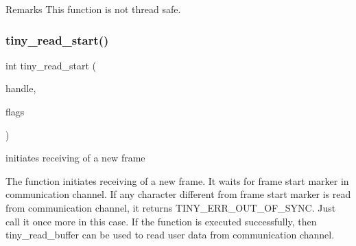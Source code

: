 \begin{DoxyRemark}{Remarks}
This function is not thread safe. 
\end{DoxyRemark}
\mbox{\label{group__ADVANCED__API_ga2f0547115de5b96a828d79f5491d22fa}} 
\subsubsection{\texorpdfstring{tiny\+\_\+read\+\_\+start()}{tiny\_read\_start()}}
{\footnotesize\ttfamily int tiny\+\_\+read\+\_\+start (\begin{DoxyParamCaption}\item[{\hyperlink{structSTinyData}{S\+Tiny\+Data} $\ast$}]{handle,  }\item[{uint8\+\_\+t}]{flags }\end{DoxyParamCaption})}



initiates receiving of a new frame 

The function initiates receiving of a new frame. It waits for frame start marker in communication channel. If any character different from frame start marker is read from communication channel, it returns T\+I\+N\+Y\+\_\+\+E\+R\+R\+\_\+\+O\+U\+T\+\_\+\+O\+F\+\_\+\+S\+Y\+NC. Just call it once more in this case. If the function is executed successfully, then tiny\+\_\+read\+\_\+buffer can be used to read user data from communication channel.


